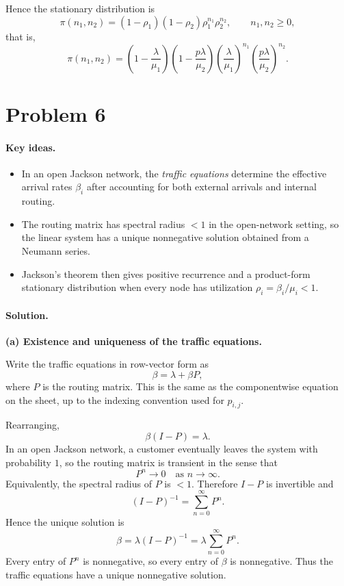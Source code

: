 \documentclass[11pt]{article}
\newcommand{\1}{\mathbf{1}}
\begin{document}
Hence the stationary distribution is
\[
    \pi(n_1,n_2)
    =
    (1-\rho_1)(1-\rho_2)\rho_1^{n_1}\rho_2^{n_2},
    \qquad n_1,n_2 \ge 0,
\]
that is,
\[
    \pi(n_1,n_2)
    =
    \left(1-\frac{\lambda}{\mu_1}\right)
    \left(1-\frac{p\lambda}{\mu_2}\right)
    \left(\frac{\lambda}{\mu_1}\right)^{n_1}
    \left(\frac{p\lambda}{\mu_2}\right)^{n_2}.
\]

\section*{Problem 6}
\paragraph{Key ideas.}
\begin{itemize}
    \item In an open Jackson network, the \emph{traffic equations} determine the effective arrival rates \(\beta_i\) after accounting for both external arrivals and internal routing.
    \item The routing matrix has spectral radius \(<1\) in the open-network setting, so the linear system has a unique nonnegative solution obtained from a Neumann series.
    \item Jackson's theorem then gives positive recurrence and a product-form stationary distribution when every node has utilization \(\rho_i=\beta_i/\mu_i<1\).
\end{itemize}

\paragraph{Solution.}
\textbf{(a) Existence and uniqueness of the traffic equations.}

Write the traffic equations in row-vector form as
\[
    \beta = \lambda + \beta P,
\]
where \(P\) is the routing matrix. This is the same as the componentwise equation on the sheet, up to the indexing convention used for \(p_{i,j}\).

Rearranging,
\[
    \beta(I-P)=\lambda.
\]
In an open Jackson network, a customer eventually leaves the system with probability \(1\), so the routing matrix is transient in the sense that
\[
    P^n \to 0 \quad \text{as } n\to\infty.
\]
Equivalently, the spectral radius of \(P\) is \(<1\). Therefore \(I-P\) is invertible and
\[
    (I-P)^{-1} = \sum_{n=0}^{\infty} P^n.
\]
Hence the unique solution is
\[
    \beta = \lambda(I-P)^{-1}
    =
    \lambda \sum_{n=0}^{\infty} P^n.
\]
Every entry of \(P^n\) is nonnegative, so every entry of \(\beta\) is nonnegative. Thus the traffic equations have a unique nonnegative solution.
\end{document}
